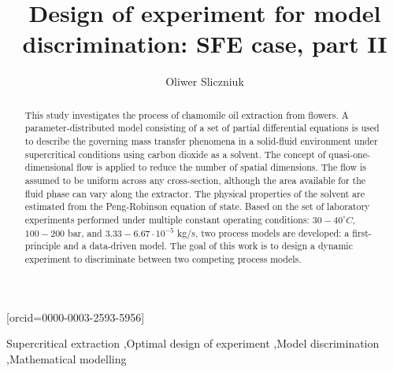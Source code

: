 \documentclass[a4paper,fleqn]{cas-dc}
\begin{document}
 

\title[mode=title]{Design of experiment for model discrimination: SFE case, part II}                      


\author[1]{Oliwer Sliczniuk}[orcid=0000-0003-2593-5956]
\cormark[1]



\address[1]{Aalto University, School of Chemical Engineering, Espoo, 02150, Finland}


\begin{abstract}
This study investigates the process of chamomile oil extraction from flowers. A parameter-distributed model consisting of a set of partial differential equations is used to describe the governing mass transfer phenomena in a solid-fluid environment under supercritical conditions using carbon dioxide as a solvent. The concept of quasi-one-dimensional flow is applied to reduce the number of spatial dimensions. The flow is assumed to be uniform across any cross-section, although the area available for the fluid phase can vary along the extractor. The physical properties of the solvent are estimated from the Peng-Robinson equation of state. Based on the set of laboratory experiments performed under multiple constant operating conditions: $30 - 40^\circ C$, $100 - 200$ bar, and $3.33-6.67 \cdot 10^{-5}$ kg/s, two process models are developed: a first-principle and a data-driven model. The goal of this work is to design a dynamic experiment to discriminate between two competing process models.

\end{abstract}

\begin{keywords}
Supercritical extraction \sep Optimal design of experiment \sep Model discrimination \sep Mathematical modelling
\end{keywords}
\end{document}
